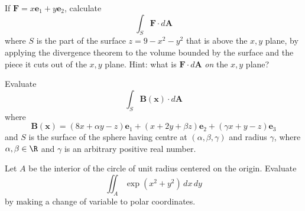 
\setcounter{question}{100}
\question If $\bm F = x \bm e_1 + y \bm e_2$, calculate
\[
    \int_S \bm F \cdot d\bm A
\]
where $S$ is the part of the surface $z = 9 - x^2 - y^2$ that is
above the $x,y$ plane, by applying the divergence theorem to the volume
bounded by the surface and the piece it cuts out of the $x,y$ plane.
Hint: what is $\bm F \cdot d\bm A$ \emph{on} the $x,y$ plane?

\setcounter{question}{103}
\question Evaluate
\[
    \int_S \bm B(\bm x) \cdot d\bm A
\]
where
\[
    \bm B(\bm x) = (8x + \alpha y - z) \bm e_1 
    + (x + 2y + \beta z) \bm e_2
    + (\gamma x + y - z) \bm e_3
\]
and $S$ is the surface of the sphere having centre at $(\alpha, \beta, \gamma)$
and radius $\gamma$, where $\alpha, \beta \in \R$ and 
$\gamma$ is an arbitrary positive real number.

\setcounter{question}{104}
\question Let $A$ be the interior of the circle of unit radius centered on the origin.
Evaluate
\[
    \iint_A \exp(x^2 + y^2) \,dx\,dy
\]
by making a change of variable to polar coordinates.

